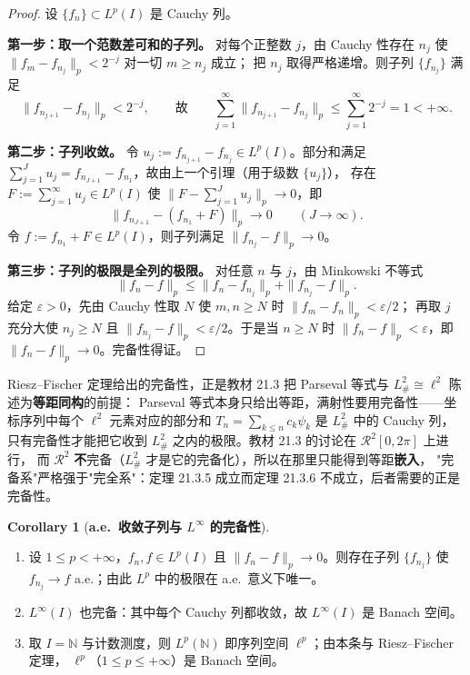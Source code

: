 \documentclass[oneside]{book}
\theoremstyle{definition}
\theoremstyle{definition}
\newtheorem{corollary}{Corollary}[section]
\begin{document}
	\begin{proof}
		设 $\{f_n\}\subset L^p(I)$ 是 Cauchy 列。
		
		\textbf{第一步：取一个范数差可和的子列。}
		对每个正整数 $j$，由 Cauchy 性存在 $n_j$ 使 $\|f_m-f_{n_j}\|_p<2^{-j}$ 对一切 $m\geqslant n_j$ 成立；
		把 $n_j$ 取得严格递增。则子列 $\{f_{n_j}\}$ 满足
		\[
		\|f_{n_{j+1}}-f_{n_j}\|_p<2^{-j},
		\qquad\text{故}\qquad
		\sum_{j=1}^\infty\|f_{n_{j+1}}-f_{n_j}\|_p\leqslant\sum_{j=1}^\infty2^{-j}=1<+\infty .
		\]
		
		\textbf{第二步：子列收敛。}
		令 $u_j:=f_{n_{j+1}}-f_{n_j}\in L^p(I)$。部分和满足
		$\sum_{j=1}^Ju_j=f_{n_{J+1}}-f_{n_1}$，故由上一个引理（用于级数 $\{u_j\}$），
		存在 $F:=\sum_{j=1}^\infty u_j\in L^p(I)$ 使
		$\bigl\|F-\sum_{j=1}^Ju_j\bigr\|_p\to0$，即
		\[
		\bigl\|f_{n_{J+1}}-(f_{n_1}+F)\bigr\|_p\longrightarrow0\qquad(J\to\infty).
		\]
		令 $f:=f_{n_1}+F\in L^p(I)$，则子列满足 $\|f_{n_j}-f\|_p\to0$。
		
		\textbf{第三步：子列的极限是全列的极限。}
		对任意 $n$ 与 $j$，由 Minkowski 不等式
		\[
		\|f_n-f\|_p\leqslant\|f_n-f_{n_j}\|_p+\|f_{n_j}-f\|_p .
		\]
		给定 $\varepsilon>0$，先由 Cauchy 性取 $N$ 使 $m,n\geqslant N$ 时 $\|f_m-f_n\|_p<\varepsilon/2$；
		再取 $j$ 充分大使 $n_j\geqslant N$ 且 $\|f_{n_j}-f\|_p<\varepsilon/2$。于是当 $n\geqslant N$ 时
		$\|f_n-f\|_p<\varepsilon$，即 $\|f_n-f\|_p\to0$。完备性得证。
	\end{proof}
	
	\begin{link}
		Riesz--Fischer 定理给出的完备性，正是教材 21.3 把 Parseval 等式与 $L^2_\#\cong\ell^2$ 陈述为\textbf{等距同构}\/的前提：
		Parseval 等式本身只给出等距，满射性要用完备性——坐标序列中每个 $\ell^2$ 元素对应的部分和 $T_n=\sum_{k\leqslant n}c_k\psi_k$
		是 $L^2_\#$ 中的 Cauchy 列，只有完备性才能把它收到 $L^2_\#$ 之内的极限。教材 21.3 的讨论在 $\mathcal R^2[0,2\pi]$ 上进行，
		而 $\mathcal R^2$ \textbf{不}完备（$L^2_\#$ 才是它的完备化），所以在那里只能得到等距\textbf{嵌入}，
		"完备系"严格强于"完全系"：定理 21.3.5 成立而定理 21.3.6 不成立，后者需要的正是完备性。
	\end{link}
	
	\begin{corollary}[\bfseries{a.e.\ 收敛子列与 $L^\infty$ 的完备性}]
		\begin{enumerate}[leftmargin=2.4em]
			\item 设 $1\leqslant p<+\infty$，$f_n,f\in L^p(I)$ 且 $\|f_n-f\|_p\to0$。则存在子列 $\{f_{n_j}\}$ 使
			$f_{n_j}\to f$ a.e.；由此 $L^p$ 中的极限在 a.e.\ 意义下唯一。
			\item $L^\infty(I)$ 也完备：其中每个 Cauchy 列都收敛，故 $L^\infty(I)$ 是 Banach 空间。
			\item 取 $I=\mathbb N$ 与计数测度，则 $L^p(\mathbb N)$ 即序列空间 $\ell^p$；由本条与 Riesz--Fischer 定理，
			$\ell^p$（$1\leqslant p\leqslant+\infty$）是 Banach 空间。
		\end{enumerate}
	\end{corollary}
	
\end{document}
